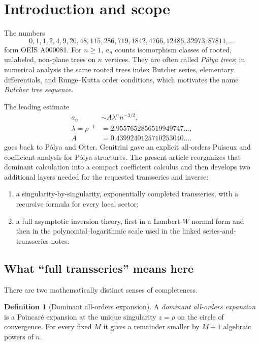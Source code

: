 \documentclass[11pt]{article}
\theoremstyle{definition}
\newtheorem{definition}[theorem]{Definition}
\theoremstyle{remark}
\begin{document}
\begingroup
\small
\tableofcontents
\endgroup
\clearpage
{}

\section{Introduction and scope}

The numbers
\[
0,1,1,2,4,9,20,48,115,286,719,1842,4766,12486,32973,87811,\ldots
\]
form OEIS A000081.  For $n\geq1$, $a_n$ counts isomorphism classes of rooted,
unlabeled, non-plane trees on $n$ vertices.  They are often called
\emph{P\'olya trees}; in numerical analysis the same rooted trees index
Butcher series, elementary differentials, and Runge--Kutta order conditions,
which motivates the name \emph{Butcher tree sequence}.

The leading estimate
\begin{align*}
 a_n&\sim A\lambda^n n^{-3/2},\\
 \lambda=\rho^{-1}&=2.9557652856519949747\ldots,\\
 A&=0.4399240125710253040\ldots.
\end{align*}
goes back to P\'olya and Otter.  Genitrini gave an explicit all-orders
Puiseux and coefficient analysis for P\'olya structures.  The present article
reorganizes that dominant calculation into a compact coefficient calculus and
then develops two additional layers needed for the requested transseries and
inverse:
\begin{enumerate}
\item a singularity-by-singularity, exponentially completed transseries, with
      a recursive formula for every local sector;
\item a full asymptotic inversion theory, first in a Lambert-$W$ normal form
      and then in the polynomial--logarithmic scale used in the linked
      series-and-transseries notes.
\end{enumerate}

\subsection{What ``full transseries'' means here}

There are two mathematically distinct senses of completeness.

\begin{definition}[Dominant all-orders expansion]
A \emph{dominant all-orders expansion} is a Poincar\'e expansion at the unique
singularity $z=\rho$ on the circle of convergence.  For every fixed $M$ it
gives a remainder smaller by $M+1$ algebraic powers of $n$.
\end{definition}
\end{document}
